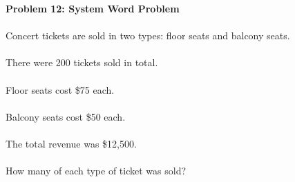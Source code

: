 \documentclass[12pt]{article}
\begin{document}
            \vspace{6cm}

            \textbf{Problem 12: System Word Problem}\\\\
            Concert tickets are sold in two types: floor seats and balcony seats.\\\\
            There were 200 tickets sold in total.\\\\
            Floor seats cost \$75 each.\\\\
            Balcony seats cost \$50 each.\\\\
            The total revenue was \$12,500.\\\\
            How many of each type of ticket was sold?
\end{document}

